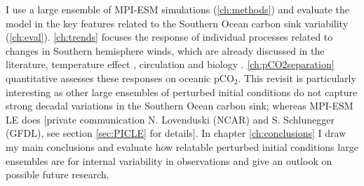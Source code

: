 I use a large ensemble of \acs{MPI-ESM} simulations (\autoref{ch:methods}) and evaluate the model in the key features related to the Southern Ocean carbon sink variability (\autoref{ch:eval}). \autoref{ch:trends} focuses the response of individual processes related to changes in Southern hemisphere winds, which are already discussed in the literature, \eg temperature effect \citep{Takahashi1993,Lovenduski2007}, circulation \citep{Abernathey2011,Hauck2013,Lauderdale2016,Lovenduski2008} and biology \citep{Lovenduski2005,Hauck2013,Tagliabue2014}. \autoref{ch:pCO2separation} quantitative assesses these responses on oceanic pCO$_2$. This revisit is particularly interesting as other large ensembles of perturbed initial conditions do not capture strong decadal variations in the Southern Ocean carbon sink; whereas \acs{MPI-ESM LE} does [private communication N. Lovenduski (\acs{NCAR}) and S. Schlunegger (\acs{GFDL}), see section \ref{sec:PICLE} for details]. In chapter \ref{ch:conclusions} I draw my main conclusions and %
evaluate how relatable perturbed initial conditions large ensembles are for internal variability in observations and give an outlook on possible future research. %


%

